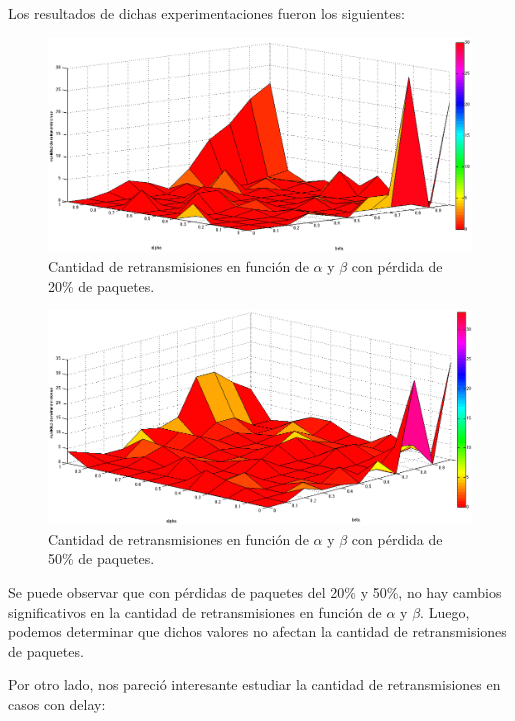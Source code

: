 \documentclass[10pt, a4paper]{article}
\begin{document}
Los resultados de dichas experimentaciones fueron los siguientes:
\begin{figure}[H]
\begin{center}
\includegraphics[width=17cm]{alphaBetaRetransmision0,2.png}
\caption{Cantidad de retransmisiones en función de $\alpha$ y $\beta$ con pérdida de 20\% de paquetes.}
\end{center}
\end{figure}

\begin{figure}[H]
\begin{center}
\includegraphics[width=17cm]{alphaBetaRetransmision0,5.png}
\caption{Cantidad de retransmisiones en función de $\alpha$ y $\beta$ con pérdida de 50\% de paquetes.}
\end{center}
\end{figure}

Se puede observar que con pérdidas de paquetes del 20\% y 50\%, no hay cambios significativos en la cantidad de retransmisiones en función de $\alpha$ y $\beta$. Luego, podemos determinar que dichos valores no afectan la cantidad de retransmisiones de paquetes.

Por otro lado, nos pareció interesante estudiar la cantidad de retransmisiones en casos con delay:
\end{document}
